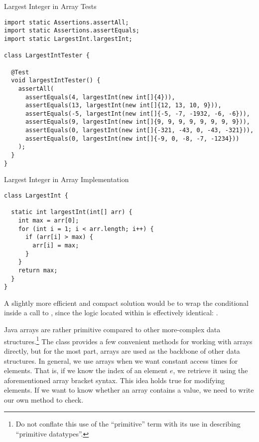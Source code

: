 \begin{cl}{Largest Integer in Array Tests}
\begin{lstlisting}[language=MyJava]
import static Assertions.assertAll;
import static Assertions.assertEquals;
import static LargestInt.largestInt;

class LargestIntTester {

  @Test
  void largestIntTester() {
    assertAll(
      assertEquals(4, largestInt(new int[]{4})), 
      assertEquals(13, largestInt(new int[]{12, 13, 10, 9})), 
      assertEquals(-5, largestInt(new int[]{-5, -7, -1932, -6, -6})), 
      assertEquals(9, largestInt(new int[]{9, 9, 9, 9, 9, 9, 9, 9})), 
      assertEquals(0, largestInt(new int[]{-321, -43, 0, -43, -321})), 
      assertEquals(0, largestInt(new int[]{-9, 0, -8, -7, -1234})) 
    );
  }
}
\end{lstlisting}
\end{cl}

\begin{cl}{Largest Integer in Array Implementation}
\begin{lstlisting}[language=MyJava]
class LargestInt {

  static int largestInt(int[] arr) {
    int max = arr[0];
    for (int i = 1; i < arr.length; i++) {
      if (arr[i] > max) {
        arr[i] = max;
      }
    }
    return max;
  }
}
\end{lstlisting}
\end{cl}

A slightly more efficient and compact solution would be to wrap the conditional inside a call to , since the logic located within is effectively identical: .

Java arrays are rather primitive compared to other more-complex data structures.\footnote{Do not conflate this use of the ``primitive'' term with its use in describing ``primitive datatypes''.} The  class provides a few convenient methods for working with arrays directly, but for the most part, arrays are used as the backbone of other data structures. In general, we use arrays when we want constant access times for elements. That is, if we know the index of an element $e$, we retrieve it using the aforementioned array bracket syntax. This idea holds true for modifying elements. If we want to know whether an array contains a value, we need to write our own method to check. 

